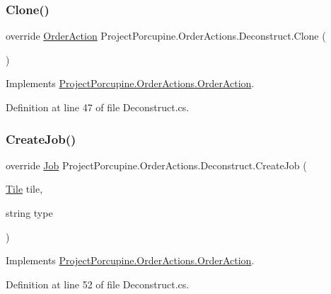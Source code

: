 \subsubsection{\texorpdfstring{Clone()}{Clone()}}
{\footnotesize\ttfamily override \hyperlink{class_project_porcupine_1_1_order_actions_1_1_order_action}{Order\+Action} Project\+Porcupine.\+Order\+Actions.\+Deconstruct.\+Clone (\begin{DoxyParamCaption}{ }\end{DoxyParamCaption})\hspace{0.3cm}{\ttfamily [virtual]}}



Implements \hyperlink{class_project_porcupine_1_1_order_actions_1_1_order_action_a34bd9be15055adc6c5397db3aab7bc5f}{Project\+Porcupine.\+Order\+Actions.\+Order\+Action}.



Definition at line 47 of file Deconstruct.\+cs.

\mbox{\label{class_project_porcupine_1_1_order_actions_1_1_deconstruct_a7f242b2767ac56ef47c07f04b3c86d2a}} 
\subsubsection{\texorpdfstring{Create\+Job()}{CreateJob()}}
{\footnotesize\ttfamily override \hyperlink{class_job}{Job} Project\+Porcupine.\+Order\+Actions.\+Deconstruct.\+Create\+Job (\begin{DoxyParamCaption}\item[{\hyperlink{class_tile}{Tile}}]{tile,  }\item[{string}]{type }\end{DoxyParamCaption})\hspace{0.3cm}{\ttfamily [virtual]}}



Implements \hyperlink{class_project_porcupine_1_1_order_actions_1_1_order_action_a84f0d2817e07e351c4a9e86172d8f5b4}{Project\+Porcupine.\+Order\+Actions.\+Order\+Action}.



Definition at line 52 of file Deconstruct.\+cs.

